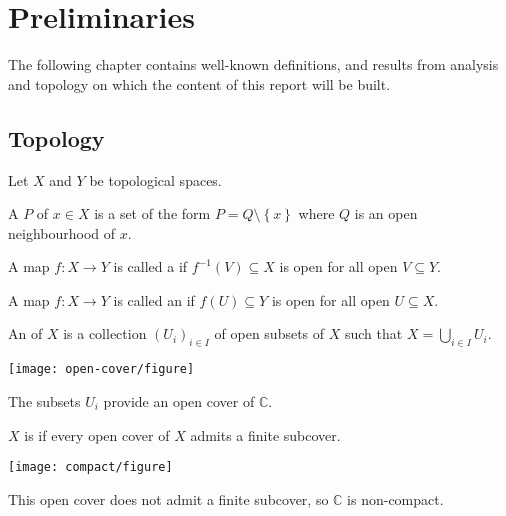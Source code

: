 \chapter{Preliminaries}\label{ch:prelims}
\begin{chout}
	The following chapter contains well-known definitions, and results from
	analysis and topology on which the content of this report will be built.
\end{chout}

\section{Topology}
Let $ X $ and $ Y $ be topological spaces.

\begin{definition}
	A  $ P $ of $ x \in X $ is a set of the form
	$ P = Q \setminus \left\{ x \right\} $ where $ Q $ is an open neighbourhood of
	$ x $.
\end{definition}

\begin{definition}
	A map $ f:X \to Y $ is called a  if $ f ^{-1}(V)
		\subseteq X $ is open for all open $ V \subseteq Y $.
\end{definition}

\begin{definition}
	A map $ f:X \to Y $ is called an  if $ f(U)\subseteq Y $ is
	open for all open $ U \subseteq X $.
\end{definition}

\begin{definition}
	An  of $ X $ is a collection $ (U_i)_{i \in I} $ of open
	subsets of $ X $ such that $ X = \bigcup_{i \in I}^{}{U_i} $.
\end{definition}

\begin{marginfigure}[-8cm]
	\centering
	\texttt{[image: open-cover/figure]}
	\caption{The subsets $ U_{i} $ provide an open cover of $ \mathbb{C} $.}
\end{marginfigure}

\begin{definition}[Compactness]
	$ X $ is  if every open cover of $ X $ admits a finite
	subcover.
\end{definition}

\begin{marginfigure}[-4cm]
	\centering
	\texttt{[image: compact/figure]}
	\caption{This open cover does not admit a finite subcover, so $ \mathbb{C} $
		is non-compact.}
\end{marginfigure}
\vspace{-\baselineskip}

